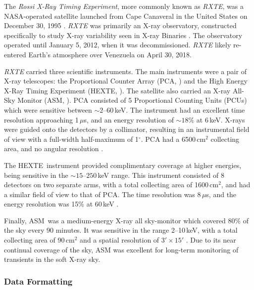 \par The \textit{Rossi X-Ray Timing Experiment}\indexrxte, more commonly known as \textit{RXTE}, was a NASA-operated satellite launched from Cape Canaveral in the United States on December 30, 1995 \citep{Bradt_RXTE}.  \textit{RXTE} was primarily an X-ray observatory, constructed specifically to study X-ray variability seen in X-ray Binaries \citep{Bradt_XTEaims}.  The observatory operated until January 5, 2012, when it was decommissioned.  \textit{RXTE} likely re-entered Earth's atmosphere over Venezuela on April 30, 2018.
\par \textit{RXTE} carried three scientific instruments.  The main instruments were a pair of X-ray telescopes: the Proportional Counter Array (PCA\indexpca, \citealp{Jahoda_PCA}) and the High Energy X-Ray Timing Experiment (HEXTE\indexhexte, \citealp{Gruber_HEXTE}).  The satellite also carried an X-ray All-Sky Monitor (ASM\indexasm, \citealp{Levine_ASM}).  PCA consisted of 5 Proportional Counting Units (PCUs) which were sensitive between $\sim2$--$60$\,keV.  The instrument had an excellent time resolution approaching 1\,$\mu$s, and an energy resolution of $\sim18\%$ at 6\,keV.  X-rays were guided onto the detectors by a collimator, resulting in an instrumental field of view with a full-width half-maximum of 1$^\circ$.  PCA had a 6500\,cm$^2$ collecting area, and no angular resolution \citep{Jahoda_PCA}.
\par The HEXTE\indexhexte\ instrument \citep{Gruber_HEXTE} provided complimentary coverage at higher energies, being sensitive in the $\sim15$--$250$\,keV range.  This instrument consisted of 8 detectors on two separate arms, with a total collecting area of 1600\,cm$^2$, and had a similar field of view to that of PCA.  The time resolution was 8\,$\mu$s, and the energy resolution was 15\% at 60\,keV \citep{Gruber_HEXTE}.
\par Finally, ASM\indexasm\ was a medium-energy X-ray all sky-monitor which covered 80\% of the sky every 90 minutes.  It was sensitive in the range 2--10\,keV, with a total collecting area of 90\,cm$^2$ and a spatial resolution of $3'\times15'$ \citep{Levine_ASM}.  Due to its near continual coverage of the sky, ASM was excellent for long-term monitoring of transients in the soft X-ray sky.

\subsubsection{Data Formatting}

